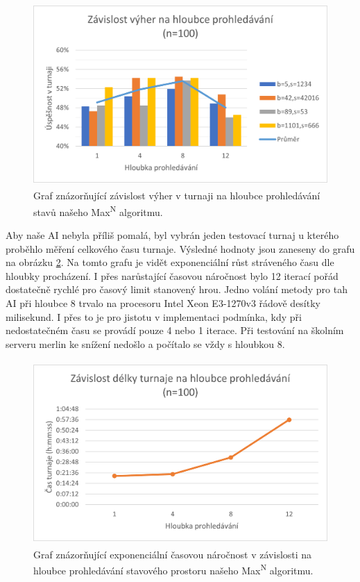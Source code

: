 \documentclass[a4paper]{article}
\begin{document}
\begin{figure}[htb]
	\centering
	\includegraphics[height=7cm]{pic/vyhry_hloubka_graf.png}
	\caption{Graf znázorňující závislost výher v turnaji na hloubce prohledávání stavů našeho Max\textsuperscript{N} algoritmu.}
	\label{graf:vyhryhloubka}
\end{figure}

Aby naše AI nebyla příliš pomalá, byl vybrán jeden testovací turnaj u kterého proběhlo měření celkového času turnaje. Výsledné hodnoty jsou zaneseny do grafu na obrázku \ref{graf:cashloubka}. Na tomto grafu je vidět exponenciální růst stráveného času dle hloubky procházení. I přes narůstající časovou náročnost bylo 12 iterací pořád dostatečně rychlé pro časový limit stanovený hrou. Jedno volání metody pro tah AI při hloubce 8 trvalo na procesoru Intel Xeon E3-1270v3 řádově desítky milisekund. I přes to je pro jistotu v implementaci podmínka, kdy při nedostatečném času se provádí pouze 4 nebo 1 iterace. Při testování na školním serveru merlin ke snížení nedošlo a počítalo se vždy s hloubkou 8.

\begin{figure}[htb]
	\centering
	\includegraphics[height=7cm]{pic/cas_hloubka_graf.png}
	\caption{Graf znázorňující exponenciální časovou náročnost v závislosti na hloubce prohledávání stavového prostoru našeho Max\textsuperscript{N} algoritmu.}
	\label{graf:cashloubka}
\end{figure}
\end{document}
